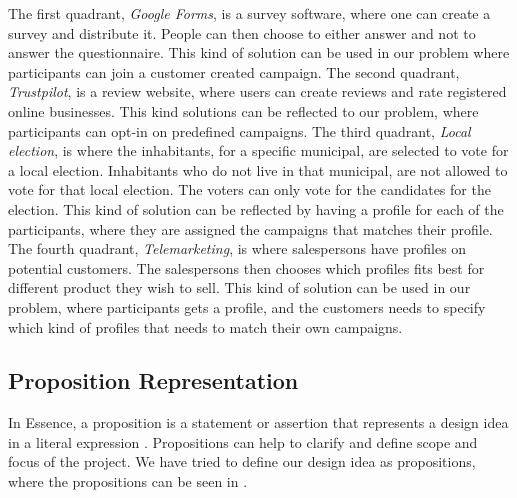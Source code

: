 The first quadrant, \emph{Google Forms}, is a survey software, where one can create a survey and distribute it. People can then choose to either answer and not to answer the questionnaire. This kind of solution can be used in our problem where participants can join a customer created campaign. The second quadrant, \emph{Trustpilot}, is a review website, where users can create reviews and rate registered online businesses. This kind solutions can be reflected to our problem, where participants can opt-in on predefined campaigns. The third quadrant, \emph{Local election}, is where the inhabitants, for a specific municipal, are selected to vote for a local election. Inhabitants who do not live in that municipal, are not allowed to vote for that local election. The voters can only vote for the candidates for the election. This kind of solution can be reflected by having a profile for each of the participants, where they are assigned the campaigns that matches their profile. The fourth quadrant, \emph{Telemarketing}, is where salespersons have profiles on potential customers. The salespersons then chooses which profiles fits best for different product they wish to sell. This kind of solution can be used in our problem, where participants gets a profile, and the customers needs to specify which kind of profiles that needs to match their own campaigns.

\subsection{Proposition Representation}
\label{sub:proposition_representation}

In Essence, a proposition is a statement or assertion that represents a design idea in a literal expression \parencite{essence_book}. Propositions can help to clarify and define scope and focus of the project. We have tried to define our design idea as propositions, where the propositions can be seen in .

